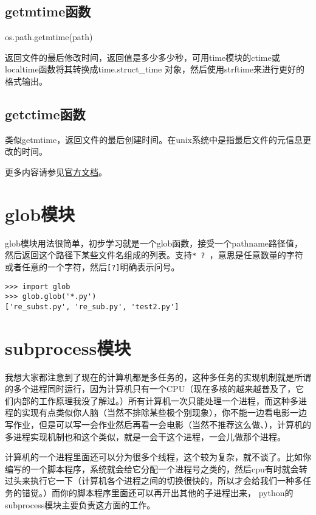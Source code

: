 \documentclass[12pt,oneside]{book}
\begin{document}
\begin{common-format}
\section{getmtime函数}
os.path.getmtime(path)

返回文件的最后修改时间，返回值是多少多少秒，可用time模块的ctime或localtime函数将其转换成time.struct\_{}time 对象，然后使用strftime来进行更好的格式输出。

\section{getctime函数}
类似getmtime，返回文件的最后创建时间。在unix系统中是指最后文件的元信息更改的时间。

\begin{large}
更多内容请参见\href{https://docs.python.org/3/library/os.path.html}{官方文档}。
\end{large}


\chapter{glob模块}
glob模块用法很简单，初步学习就是一个glob函数，接受一个pathname路径值，然后返回这个路径下某些文件名组成的列表。支持\verb+* ? +，意思是任意数量的字符或者任意的一个字符，然后\verb+[?]+明确表示问号。
\begin{Verbatim}
>>> import glob
>>> glob.glob('*.py')
['re_subst.py', 're_sub.py', 'test2.py']
\end{Verbatim}




\chapter{subprocess模块}
我想大家都注意到了现在的计算机都是多任务的，这种多任务的实现机制就是所谓的多个进程同时运行，因为计算机只有一个CPU（现在多核的越来越普及了，它们内部的工作原理我没了解过。）所有计算机一次只能处理一个进程，而这种多进程的实现有点类似你人脑（当然不排除某些极个别现象），你不能一边看电影一边写作业，但是可以写一会作业然后再看一会电影（当然不推荐这么做、），计算机的多进程实现机制也和这个类似，就是一会干这个进程，一会儿做那个进程。

计算机的一个进程里面还可以分为很多个线程，这个较为复杂，就不谈了。比如你编写的一个脚本程序，系统就会给它分配一个进程号之类的，然后cpu有时就会转过头来执行它一下（计算机各个进程之间的切换很快的，所以才会给我们一种多任务的错觉。）而你的脚本程序里面还可以再开出其他的子进程出来， python的subprocess模块主要负责这方面的工作。


\end{common-format}
\end{document}
